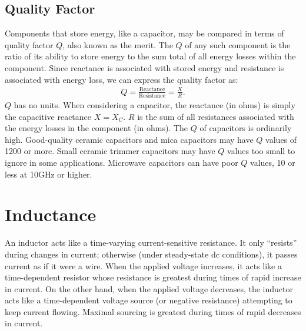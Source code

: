 \documentclass[../../document]{subfiles}
\begin{document}
\subsection{Quality Factor}
Components that store energy, like a capacitor, may be compared in terms of
quality factor \(Q\), also known as the merit. The \(Q\)  of any such component
is the ratio of its ability to store energy to the sum total of all energy
losses within the component. Since reactance is associated with stored energy
and resistance is associated with energy loss, we can express the quality
factor as:
\begin{gather}
	Q=\frac{\text{Reactance}}{\text{Resistance}}=\frac{X}{R}.
\end{gather}
\(Q\)  has no units. When considering a capacitor, the reactance (in ohms) is
simply the capacitive reactance \(X=X_C\).  \(R\) is the sum of all resistances
associated with the energy losses in the component (in ohms). The \(Q\)  of
capacitors is ordinarily high. Good-quality ceramic capacitors and mica
capacitors may have \(Q\)  values of 1200 or more. Small ceramic trimmer
capacitors may have \(Q\) values too small to ignore in some applications.
Microwave capacitors can have poor \(Q\)  values, 10 or less at
10\unit{\giga\hertz} or higher. \cite{practical_electronics}

\section{Inductance}
An inductor acts like a time-varying current-sensitive resistance. It only
\enquote{resists} during changes in current; otherwise (under steady-state dc
conditions), it passes current as if it were a wire. When the applied voltage
increases, it acts like a time-dependent resistor whose resistance is greatest
during times of rapid increase in current. On the other hand, when the applied
voltage decreases, the inductor acts like a time-dependent voltage source (or
negative resistance) attempting to keep current flowing. Maximal sourcing is
greatest during times of rapid decreases in current. \cite{practical_electronics}
\end{document}
